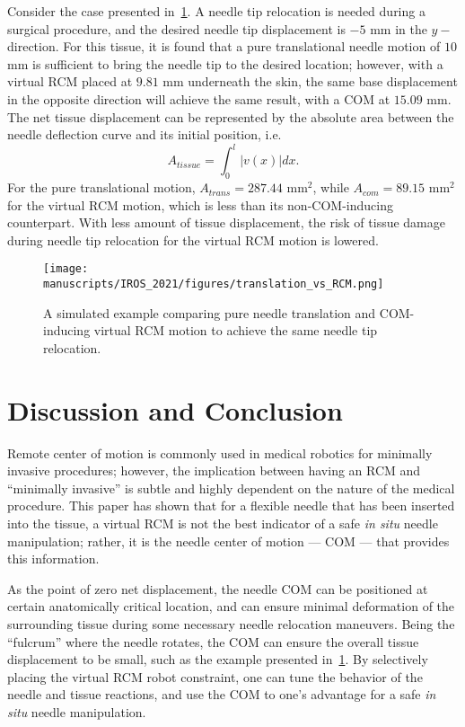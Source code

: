 Consider the case presented in~\cref{fig:trans_vs_com}. A needle tip relocation is needed during a surgical procedure, and the desired needle tip displacement is $-5$ mm in the $y-$direction. For this tissue, it is found that a pure translational needle motion of  $10$ mm is sufficient to bring the needle tip to the desired location; however, with a virtual RCM placed at $9.81$ mm underneath the skin, the same base displacement in the opposite direction will achieve the same result, with a COM at $15.09$ mm. The net tissue displacement can be represented by the absolute area between the needle deflection curve and its initial position, i.e.
\begin{equation}
  A_{tissue} = \int_0^{l}{|v(x)|}dx.
\end{equation}
For the pure translational motion, $A_{trans} = 287.44$ mm$^2$, while $A_{com} = 89.15$ mm$^2$ for the virtual RCM motion, which is less than its non-COM-inducing counterpart. With less amount of tissue displacement, the risk of tissue damage during needle tip relocation for the virtual RCM motion is lowered.

\begin{figure}[tb]
  \centering
  \texttt{[image: manuscripts/IROS\_2021/figures/translation\_vs\_RCM.png]}
  \caption{A simulated example comparing pure needle translation and COM-inducing virtual RCM motion to achieve the same needle tip relocation.}
  \label{fig:trans_vs_com}
\end{figure}

\section{Discussion and Conclusion} 
\label{sec:chap-2-discussion-and-conclusion}
Remote center of motion is commonly used in medical robotics for minimally invasive procedures; however, the implication between having an RCM and ``minimally invasive'' is subtle and highly dependent on the nature of the medical procedure. This paper has shown that for a flexible needle that has been inserted into the tissue, a virtual RCM is not the best indicator of a safe \textit{in situ} needle manipulation; rather, it is the needle center of motion --- COM --- that provides this information. 

As the point of zero net displacement, the needle COM can be positioned at certain anatomically critical location, and can ensure minimal deformation of the surrounding tissue during some necessary needle relocation maneuvers. Being the ``fulcrum'' where the needle rotates, the COM can ensure the overall tissue displacement to be small, such as the example presented in~\cref{fig:trans_vs_com}. By selectively placing the virtual RCM robot constraint, one can tune the behavior of the needle and tissue reactions, and use the COM to one's advantage for a safe \textit{in situ} needle manipulation.

